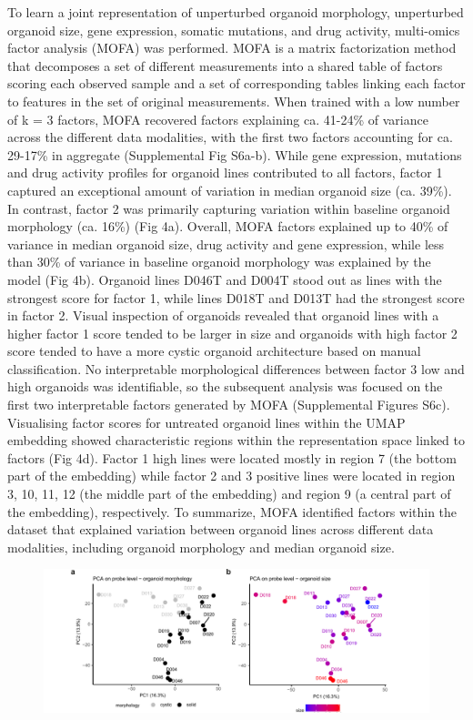 \begin{flushleft}
To learn a joint representation of unperturbed organoid morphology, unperturbed organoid size, gene expression, somatic mutations, and drug activity, multi-omics factor analysis (MOFA) was performed. MOFA is a matrix factorization method that decomposes a set of different measurements into a shared table of factors scoring each observed sample and a set of corresponding tables linking each factor to features in the set of original measurements. When trained with a low number of k = 3 factors, MOFA recovered factors explaining ca. 41-24\% of variance across the different data modalities, with the first two factors accounting for ca. 29-17\% in aggregate (Supplemental Fig S6a-b). While gene expression, mutations and drug activity profiles for organoid lines contributed to all factors, factor 1 captured an exceptional amount of variation in median organoid size (ca. 39\%). In contrast, factor 2 was primarily capturing variation within baseline organoid morphology (ca. 16\%) (Fig 4a). Overall, MOFA factors explained up to 40\% of variance in median organoid size, drug activity and gene expression, while less than 30\% of variance in baseline organoid morphology was explained by the model (Fig 4b). Organoid lines D046T and D004T stood out as lines with the strongest score for factor 1, while lines D018T and D013T had the strongest score in factor 2. Visual inspection of organoids revealed that organoid lines with a higher factor 1 score tended to be larger in size and organoids with high factor 2 score tended to have a more cystic organoid architecture based on manual classification. No interpretable morphological differences between factor 3 low and high organoids was identifiable,  so the subsequent analysis was focused on the first two interpretable factors generated by MOFA (Supplemental Figures S6c). Visualising factor scores for untreated organoid lines within the UMAP embedding showed characteristic regions within the representation space linked to factors (Fig 4d). Factor 1 high lines were located mostly in region 7 (the bottom part of the embedding) while factor 2 and 3 positive lines were located in region 3, 10, 11, 12 (the middle part of the embedding) and region 9 (a central part of the embedding), respectively. To summarize, MOFA identified factors within the dataset that explained variation between organoid lines across different data modalities, including organoid morphology and median organoid size. 


\begin{figure}[h]
\centering
\includegraphics[width=\textwidth,
                height=\textheight,
                keepaspectratio]{figures/promise/pdf/fig_4_1.pdf}
\caption{}
\label{fig_241}
\end{figure}
\bigbreak


\end{flushleft}
